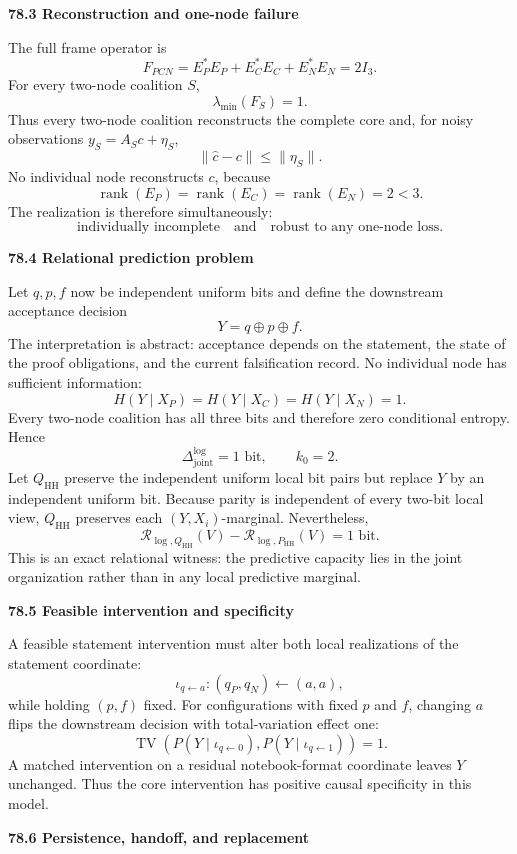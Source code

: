 \documentclass[11pt,letterpaper]{article}
\newcommand{\Risk}{\mathcal R}
\DeclareMathOperator{\TV}{TV}
\newcommand{\subtopic}[1]{%
 \vspace{0.45em}
 {\bfseries\color{AccentColor} #1\par}
}
\theoremstyle{plain}
\theoremstyle{definition}
\begin{document}
\subtopic{78.3 Reconstruction and one-node failure}

The full frame operator is
\[
F_{PCN}=E_P^*E_P+E_C^*E_C+E_N^*E_N=2I_3.
\]
For every two-node coalition \(S\),
\[
\lambda_{\min}(F_S)=1.
\]
Thus every two-node coalition reconstructs the complete core and, for noisy
observations \(y_S=A_Sc+\eta_S\),
\[
\|\widehat c-c\|
\leq
\|\eta_S\|.
\]
No individual node reconstructs \(c\), because
\[
\operatorname{rank}(E_P)
=
\operatorname{rank}(E_C)
=
\operatorname{rank}(E_N)
=2<3.
\]
The realization is therefore simultaneously:
\[
\text{individually incomplete}
\quad\text{and}\quad
\text{robust to any one-node loss}.
\]

\subtopic{78.4 Relational prediction problem}

Let \(q,p,f\) now be independent uniform bits and define the downstream
acceptance decision
\[
Y=q\oplus p\oplus f.
\]
The interpretation is abstract: acceptance depends on the statement, the state
of the proof obligations, and the current falsification record. No individual
node has sufficient information:
\[
H(Y\mid X_P)
=
H(Y\mid X_C)
=
H(Y\mid X_N)
=1.
\]
Every two-node coalition has all three bits and therefore zero conditional
entropy. Hence
\[
\boxed{
\Delta_{\mathrm{joint}}^{\log}=1\text{ bit},
\qquad
k_0=2.
}
\]
Let \(Q_{\mathrm{HH}}\) preserve the independent uniform local bit pairs but
replace \(Y\) by an independent uniform bit. Because parity is independent of
every two-bit local view, \(Q_{\mathrm{HH}}\) preserves each
\((Y,X_i)\)-marginal. Nevertheless,
\[
\Risk_{\log,Q_{\mathrm{HH}}}(V)
-
\Risk_{\log,P_{\mathrm{HH}}}(V)
=1\text{ bit}.
\]
This is an exact relational witness: the predictive capacity lies in the joint
organization rather than in any local predictive marginal.

\subtopic{78.5 Feasible intervention and specificity}

A feasible statement intervention must alter both local realizations of the
statement coordinate:
\[
\iota_{q\leftarrow a}:
(q_P,q_N)\leftarrow(a,a),
\]
while holding \((p,f)\) fixed. For configurations with fixed \(p\) and \(f\),
changing \(a\) flips the downstream decision with total-variation effect one:
\[
\TV
\left(
P(Y\mid\iota_{q\leftarrow0}),
P(Y\mid\iota_{q\leftarrow1})
\right)
=1.
\]
A matched intervention on a residual notebook-format coordinate leaves \(Y\)
unchanged. Thus the core intervention has positive causal specificity in this
model.

\subtopic{78.6 Persistence, handoff, and replacement}
\end{document}
